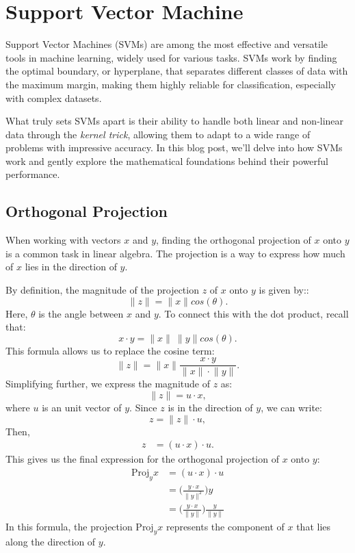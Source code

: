 \chapter{Support Vector Machine}
Support Vector Machines (SVMs) are among the most effective and versatile tools in machine learning, widely used for various tasks. SVMs work by finding the optimal boundary, or hyperplane, that separates different classes of data with the maximum margin, making them highly reliable for classification, especially with complex datasets.

What truly sets SVMs apart is their ability to handle both linear and non-linear data through the \textit{kernel trick}, allowing them to adapt to a wide range of problems with impressive accuracy. In this blog post, we'll delve into how SVMs work and gently explore the mathematical foundations behind their powerful performance.


\section{Orthogonal Projection}
When working with vectors $x$ and $y$, finding the orthogonal projection of $x$ onto $y$ is a common task in linear algebra. The projection is a way to express how much of $x$ lies in the direction of $y$.

By definition, the magnitude of the projection $z$ of $x$ onto $y$ is given by::
$$\lVert z\rVert  = \lVert x\rVert cos(\theta).$$
Here, $\theta$ is the angle between $x$ and $y$. To connect this with the dot product, recall that:
$$x\cdot y = \lVert x\rVert \ \lVert y\rVert  cos(\theta).$$
This formula allows us to replace the cosine term:
$$\lVert z\rVert  = \lVert x\rVert \frac{x\cdot y}{\lVert x\rVert \cdot\lVert y\rVert }.$$
Simplifying further, we express the magnitude of $z$ as:
$$\lVert z\rVert = u\cdot x,$$
where $u$ is an unit vector of $y$. Since $z$ is in the direction of $y$, we can write:
$$z = \lVert z\rVert \cdot u,$$
Then, 
\begin{align*}
	z &= (u\cdot x)\cdot u.
\end{align*}
This gives us the final expression for the orthogonal projection of $x$ onto $y$:
\begin{align*}
	\textrm{Proj}_yx &= (u\cdot x)\cdot u\\ 
					 &= \Bigg(\frac{y\cdot x}{\lVert y\rVert ^2}\Bigg)y\\
					 &= \Bigg(\frac{y\cdot x}{\lVert y\rVert }\Bigg)\frac{y}{\lVert y\rVert }
\end{align*}
In this formula, the projection $\textrm{Proj}_yx$ represents the component of $x$ that lies along the direction of $y$.

